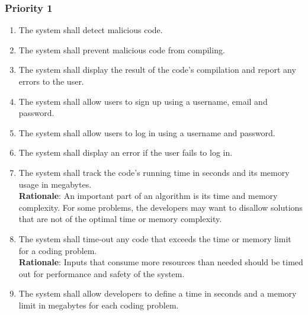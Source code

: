\documentclass[12pt, titlepage]{article}
\begin{document}
\subsubsection{Priority 1}
\begin{enumerate}[label=FR.\arabic*, resume] 
    \item The system shall detect malicious code.\label{FR.14}
    \item The system shall prevent malicious code from compiling. \label{FR.15}
    \item The system shall display the result of the code's compilation and report any errors to the user. \label{FR.16}
    \item The system shall allow users to sign up using a username, email and password. \label{FR.17}
    \item The system shall allow users to log in using a username and password. \label{FR.18}
    \item The system shall display an error if the user fails to log in. \label{FR.19}
    \item The system shall track the code's running time in seconds and its memory usage in megabytes. \label{FR.20}\\
    \textbf{Rationale}: An important part of an algorithm is its time and memory complexity. For some problems, the developers may want to disallow solutions that are not of the optimal time or memory complexity.
    \item The system shall time-out any code that exceeds the time or memory limit for a coding problem. \label{FR.21} \\
     \textbf{Rationale}: Inputs that consume more resources than needed should be timed out for performance and safety of the system.  
    \item The system shall allow developers to define a time in seconds and a memory limit in megabytes for each coding problem. \label{FR.22}

\end{enumerate}
\end{document}
